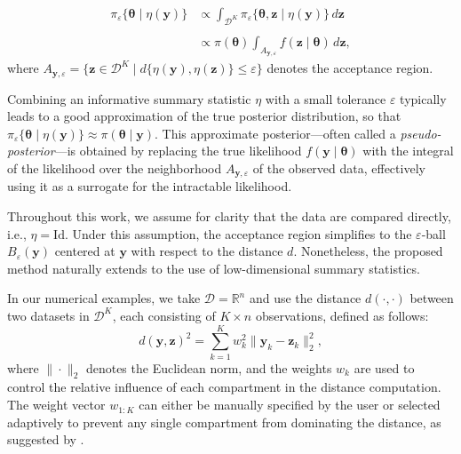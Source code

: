 \documentclass[lineno]{biometrika}
\def\Clust{K}
\def\dataspace{\mathcal{D}}
\def\obsdata{\mathbf{y}}
\def\param{\boldsymbol{\theta}}
\def\simdata{\mathbf{z}}
\begin{document}
\begin{equation}
    \label{eqabc}
    \begin{split}
        \pi_{\varepsilon}\{\param \mid \eta(\obsdata)\} &\propto
        \int_{\dataspace^\Clust} \pi_{\varepsilon}\{\param, \simdata \mid \eta(\obsdata)\} \, d\simdata \\\\
        &\propto \pi(\param) \int_{A_{\obsdata,\varepsilon}} f(\simdata \mid \param) \, d\simdata,
    \end{split}
\end{equation}
where $A_{\obsdata,\varepsilon} = \{\simdata \in \dataspace^\Clust \mid d\{\eta(\obsdata), \eta(\simdata)\} \leq \varepsilon\}$ denotes the acceptance region.

Combining an informative summary statistic $\eta$ with a small tolerance $\varepsilon$ typically leads to a good approximation of the true posterior distribution, so that $\pi_{\varepsilon}\{\param \mid \eta(\obsdata)\} \approx \pi(\param \mid \obsdata)$. This approximate posterior—often called a \emph{pseudo-posterior}—is obtained by replacing the true likelihood $f(\obsdata \mid \param)$ with the integral of the likelihood over the neighborhood $A_{\obsdata,\varepsilon}$ of the observed data, effectively using it as a surrogate for the intractable likelihood.

Throughout this work, we assume for clarity that the data are compared directly, i.e., $\eta = \mathrm{Id}$. Under this assumption, the acceptance region simplifies to the $\varepsilon$-ball $B_{\varepsilon}(\obsdata)$ centered at $\obsdata$ with respect to the distance $d$. Nonetheless, the proposed method naturally extends to the use of low-dimensional summary statistics.


In our numerical examples, we take $\dataspace = \mathbb R^n$ and use the distance $d(\cdot,\cdot)$ between two datasets in \( \dataspace^K \), each consisting of \( K \times n \) observations, defined as follows: 
\begin{equation}
    \label{eqdistance}
    d(\obsdata, \simdata)^2 = {\sum_{k=1}^K w_k^2 \| \obsdata_k - \simdata_k \|_2^2},
\end{equation}
where \( \| \cdot \|_2 \) denotes the Euclidean norm, and the weights \( w_k \) are used to control the relative influence of each compartment in the distance computation. The weight vector \( w_{1:K} \) can either be manually specified by the user or selected adaptively to prevent any single compartment from dominating the distance, as suggested by \citet{prangle2017adapting}.
\end{document}
